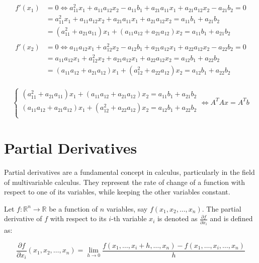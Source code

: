 $$
\begin{aligned}
    f'(x_1) &= 0 \Leftrightarrow a_{11}^2x_1 + a_{11}a_{12}x_2 - a_{11}b_1 + a_{21}a_{11}x_1 + a_{21}a_{12}x_2 - a_{21}b_2 = 0 \\
    &= a_{11}^2x_1 + a_{11}a_{12}x_2 + a_{21}a_{11}x_1 + a_{21}a_{12}x_2 = a_{11}b_1 + a_{21}b_2 \\
    &= (a_{11}^2 + a_{21}a_{11})x_1 + (a_{11}a_{12} + a_{21}a_{12})x_2 = a_{11}b_1 + a_{21}b_2 \\
\end{aligned}
$$
$$
\begin{aligned}
    f'(x_2) &= 0 \Leftrightarrow a_{11}a_{12}x_1 + a_{12}^2x_2 - a_{12}b_1 + a_{21}a_{12}x_1 + a_{22}a_{12}x_2 - a_{22}b_2 = 0 \\
    &= a_{11}a_{12}x_1 + a_{12}^2x_2 + a_{21}a_{12}x_1 + a_{22}a_{12}x_2 = a_{12}b_1 + a_{22}b_2 \\
    &= (a_{11}a_{12} + a_{21}a_{12})x_1 + (a_{12}^2 + a_{22}a_{12})x_2 = a_{12}b_1 + a_{22}b_2 \\
\end{aligned}
$$

$$
\begin{cases}
    (a_{11}^2 + a_{21}a_{11})x_1 + (a_{11}a_{12} + a_{21}a_{12})x_2 = a_{11}b_1 + a_{21}b_2 \\
    (a_{11}a_{12} + a_{21}a_{12})x_1 + (a_{12}^2 + a_{22}a_{12})x_2 = a_{12}b_1 + a_{22}b_2 \\
\end{cases}
\Leftrightarrow
A^TAx = A^Tb
$$
\section{Partial Derivatives}

Partial derivatives are a fundamental concept in calculus, particularly in the field of multivariable calculus. They represent the rate of change of a function with respect to one of its variables, while keeping the other variables constant.

Let \( f: \mathbb{R}^n \rightarrow \mathbb{R} \) be a function of \( n \) variables, say \( f(x_1, x_2, \ldots, x_n) \). The partial derivative of \( f \) with respect to its \( i \)-th variable \( x_i \) is denoted as \( \frac{\partial f}{\partial x_i} \) and is defined as:

\[
\frac{\partial f}{\partial x_i}(x_1, x_2, \ldots, x_n) = \lim_{h \rightarrow 0} \frac{f(x_1, \ldots, x_i + h, \ldots, x_n) - f(x_1, \ldots, x_i, \ldots, x_n)}{h}
\]

